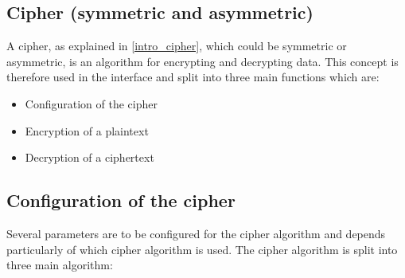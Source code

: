 \subsection{Cipher (symmetric and asymmetric)}
\label{gci_ciph}
A cipher, as explained in \ref{intro_cipher}, which
could be symmetric or asymmetric, is an algorithm for encrypting and decrypting
data.
This concept is therefore used in the interface and split into three main
functions which are:
\begin{itemize}[noitemsep]
  \item Configuration of the cipher
  \item Encryption of a plaintext
  \item Decryption of a ciphertext
\end{itemize}

\subsection*{Configuration of the cipher}
Several parameters are to be configured for the cipher algorithm and depends
particularly of which cipher algorithm is used.
The cipher algorithm is split into three main algorithm:

